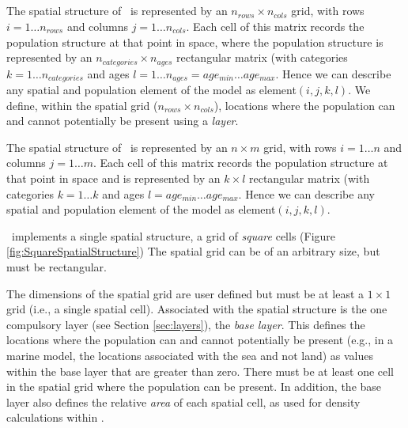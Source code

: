 \subsection{}

The spatial structure of \SPM\ is represented by an $n_{rows} \times n_{cols}$ grid, with rows $i=1 \dots n_{rows}$ and columns $j=1 \ldots n_{cols}$. Each cell of this matrix records the population structure at that point in space, where the population structure is represented by an $n_{categories} \times n_{ages}$ rectangular matrix (with categories $k=1 \ldots n_{categories}$ and ages $l=1 \ldots n_{ages} = age_{min} \ldots age_{max}$. Hence we can describe any spatial and population element of the model as element$(i,j,k,l)$. We define, within the spatial grid ($n_{rows} \times n_{cols}$), locations where the population can and cannot potentially be present using a \emph{layer}. 

The spatial structure of \SPM\ is represented by an $n \times m$ grid, with rows $i=1 \dots n$ and columns $j=1 \ldots m$. Each cell of this matrix records the population structure at that point in space and is represented by an $k \times l$ rectangular matrix (with categories $k=1 \ldots k$ and ages $l=age_{min} \ldots age_{max}$. Hence we can describe any spatial and population element of the model as element$(i,j,k,l)$. 

\SPM\ implements a single spatial structure, a grid of \emph{square} cells (Figure \ref{fig:SquareSpatialStructure}) The spatial grid can be of an arbitrary size, but must be rectangular. 

The dimensions of the spatial grid are user defined but must be at least a $1 \times 1$ grid (i.e., a single spatial cell). Associated with the spatial structure is the one compulsory layer (see Section \ref{sec:layers}), the \emph{base layer}. This defines the locations where the population can and cannot potentially be present (e.g., in a marine model, the locations associated with the sea and not land) as values within the base layer that are greater than zero. There must be at least one cell in the spatial grid where the population can be present. In addition, the base layer also defines the relative \emph{area} of each spatial cell, as used for density calculations within \SPM.

